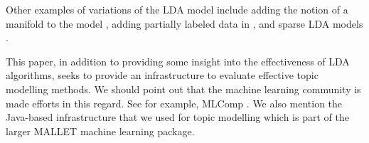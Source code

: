 Other examples of variations of the LDA model include adding the
notion of a manifold to the model \cite{DTM}, adding partially labeled
data in \cite{Partial}, and sparse LDA models
\cite{MimnoSparse}. 

This paper, in addition to providing some insight into the
effectiveness of LDA algorithms, seeks to provide an infrastructure to
evaluate effective topic modelling methods. We should point out that
the machine learning community is made efforts in this regard.  See
for example, MLComp \cite{MLComp}. We also mention the Java-based
infrastructure that we used for topic modelling \cite{McCallumMALLET}
which is part of the larger MALLET machine learning package.

